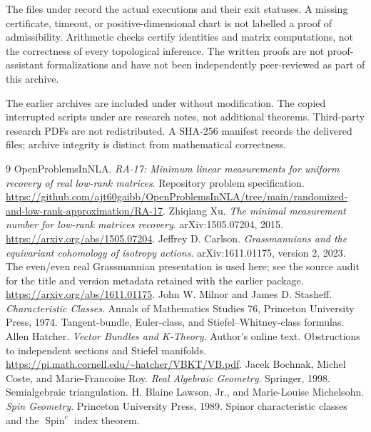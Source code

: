 \documentclass[11pt]{article}
\theoremstyle{remark}\newtheorem{remark}[theorem]{Remark}
\begin{document}
The files under  record the actual executions and their exit
statuses. A missing certificate, timeout, or positive-dimensional chart is not
labelled a proof of admissibility. Arithmetic checks certify identities and
matrix computations, not the correctness of every topological inference.
The written proofs are not proof-assistant formalizations and have not been
independently peer-reviewed as part of this archive.

The earlier archives are included under  without modification.
The copied interrupted scripts under  are research notes,
not additional theorems. Third-party research PDFs are not redistributed.
A SHA-256 manifest records the delivered files; archive integrity is distinct
from mathematical correctness.

\begin{thebibliography}{9}
 OpenProblemsInNLA. \emph{RA-17: Minimum linear measurements for
uniform recovery of real low-rank matrices}. Repository problem specification.
\url{https://github.com/ajt60gaibb/OpenProblemsInNLA/tree/main/randomized-and-low-rank-approximation/RA-17}.
 Zhiqiang Xu. \emph{The minimal measurement number for low-rank
matrices recovery}. arXiv:1505.07204, 2015.
\url{https://arxiv.org/abs/1505.07204}.
 Jeffrey D. Carlson. \emph{Grassmannians and the equivariant cohomology of isotropy actions}. arXiv:1611.01175, version 2, 2023. The even/even real
Grassmannian presentation is used here; see the source audit for the title
and version metadata retained with the earlier package.
\url{https://arxiv.org/abs/1611.01175}.
 John W. Milnor and James D. Stasheff. \emph{Characteristic Classes}.
Annals of Mathematics Studies 76, Princeton University Press, 1974.
Tangent-bundle, Euler-class, and Stiefel--Whitney-class formulas.
 Allen Hatcher. \emph{Vector Bundles and K-Theory}.
Author's online text. Obstructions to independent sections and Stiefel manifolds.
\url{https://pi.math.cornell.edu/~hatcher/VBKT/VB.pdf}.
 Jacek Bochnak, Michel Coste, and Marie-Francoise Roy.
\emph{Real Algebraic Geometry}. Springer, 1998. Semialgebraic triangulation.
 H. Blaine Lawson, Jr., and Marie-Louise Michelsohn.
\emph{Spin Geometry}. Princeton University Press, 1989.
Spinor characteristic classes and the $\operatorname{Spin}^c$ index theorem.
\end{thebibliography}
\end{document}
